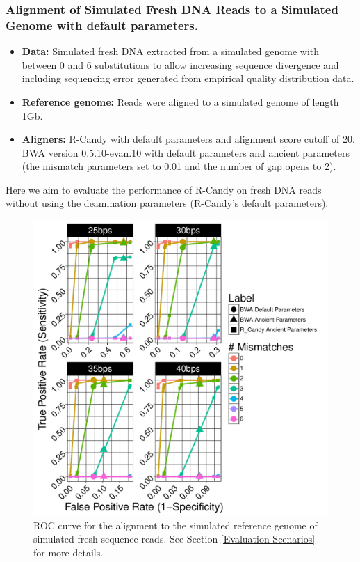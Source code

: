 \documentclass[11pt,a4paper]{report}
\begin{document}


\subsubsection {Alignment of Simulated Fresh DNA Reads to a Simulated Genome 
with default parameters.}

\label {Alignment of Simulated Fresh DNA Reads to a Simulated Genome with 
default parameters.}
 
 
 \begin{itemize}

   \item \textbf{Data:} Simulated fresh DNA extracted from a simulated genome 
   with between 0 and 6 substitutions to allow increasing sequence divergence
   and including sequencing error generated from empirical quality distribution 
   data.
 
   
   \item \textbf{Reference genome:} Reads were aligned to a simulated genome of 
   length 1Gb.

    \item \textbf{Aligners:} 
     R-Candy with default parameters and alignment score cutoff of 20. \\
     BWA version 0.5.10-evan.10 with default parameters and ancient parameters 
     (the mismatch parameters set to
     0.01 and the number of gap opens to 2)\cite{green2010draft}.

  \end{itemize}
 
Here we aim to evaluate the performance of R-Candy on fresh DNA reads 
without using the deamination parameters (R-Candy's default parameters).


\begin{figure}[H]
\centering
\includegraphics[width=12cm]{pictures/f_DS3_emp.pdf}
\caption{
ROC curve for the alignment to the simulated reference genome of simulated 
fresh sequence reads. See Section \ref{Evaluation Scenarios} 
for more details.}
\label{DS3_emp}
\end{figure}
\end{document}
